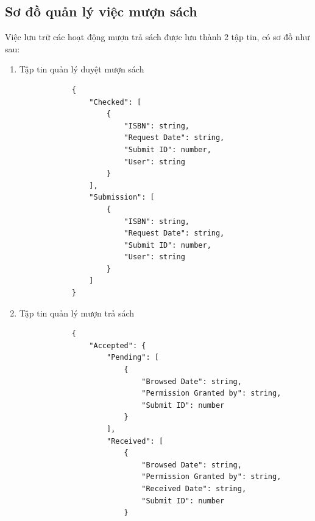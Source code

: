 \documentclass[12pt,a4paper]{report}
\begin{document}
        \subsection{Sơ đồ quản lý việc mượn sách}
        Việc lưu trữ các hoạt động mượn trả sách được lưu thành 2 tập tin, có sơ đồ như sau:
            \begin{enumerate}
                \item Tập tin quản lý duyệt mượn sách
%
            \begin{verbatim}
            {
                "Checked": [
                    {
                        "ISBN": string,
                        "Request Date": string,
                        "Submit ID": number,
                        "User": string
                    }
                ],
                "Submission": [
                    {
                        "ISBN": string,
                        "Request Date": string,
                        "Submit ID": number,
                        "User": string
                    }
                ]
            }
            \end{verbatim}
                \newpage
                \item Tập tin quản lý mượn trả sách
%
            \begin{verbatim}
            {
                "Accepted": {
                    "Pending": [
                        {
                            "Browsed Date": string,
                            "Permission Granted by": string,
                            "Submit ID": number
                        }
                    ],
                    "Received": [
                        {
                            "Browsed Date": string,
                            "Permission Granted by": string,
                            "Received Date": string,
                            "Submit ID": number
                        }

\end{verbatim}
\end{enumerate}
\end{document}
